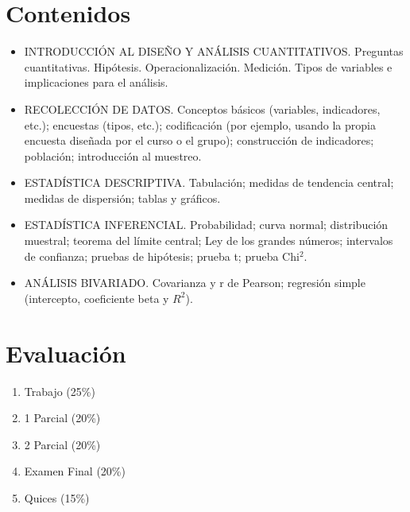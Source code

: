 \documentclass[letterpaper]{article}
\begin{document}
\section{Contenidos}
\begin{itemize}
	
\item	INTRODUCCIÓN AL DISEÑO Y ANÁLISIS CUANTITATIVOS. Preguntas cuantitativas. Hipótesis. Operacionalización. Medición. Tipos de variables e implicaciones para el análisis.
\item	RECOLECCIÓN DE DATOS. Conceptos básicos (variables, indicadores, etc.); encuestas (tipos, etc.); codificación (por ejemplo, usando la propia encuesta diseñada por el curso o el grupo); construcción de indicadores; población; introducción al muestreo.
\item	ESTADÍSTICA DESCRIPTIVA. Tabulación; medidas de tendencia central; medidas de dispersión; tablas y gráficos.
\item	ESTADÍSTICA INFERENCIAL. Probabilidad; curva normal; distribución muestral; teorema del límite central; Ley de los grandes números; intervalos de confianza; pruebas de hipótesis; prueba t; prueba Chi$^2$.  
\item	ANÁLISIS BIVARIADO. Covarianza y r de Pearson; regresión simple (intercepto, coeficiente beta y $R^2$).
\end{itemize}

\section{Evaluación}
\begin{enumerate}
	\item Trabajo (25\%)
\item 1 Parcial (20\%)
\item 2 Parcial (20\%)
\item Examen Final (20\%)
\item Quices (15\%)
\end{enumerate}
\end{document}
